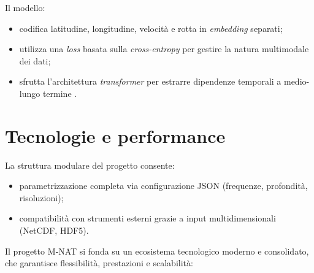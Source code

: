 \noindent Il modello:
\begin{itemize}
  \item codifica latitudine, longitudine, velocità e rotta in \textit{embedding} separati;
  \item utilizza una \textit{loss} basata sulla \textit{cross-entropy} per gestire la natura multimodale dei dati;
  \item sfrutta l'architettura \textit{transformer} per estrarre dipendenze temporali a medio-lungo termine \cite{nguyen2021traisformer}.
\end{itemize}

\section{Tecnologie e performance}

La struttura modulare del progetto consente:
\begin{itemize}
  \item parametrizzazione completa via configurazione JSON (frequenze, profondità, risoluzioni);
  \item compatibilità con strumenti esterni grazie a input multidimensionali (NetCDF, HDF5).
\end{itemize}

Il progetto M‑NAT si fonda su un ecosistema tecnologico moderno e consolidato, che garantisce flessibilità, prestazioni e scalabilità:

